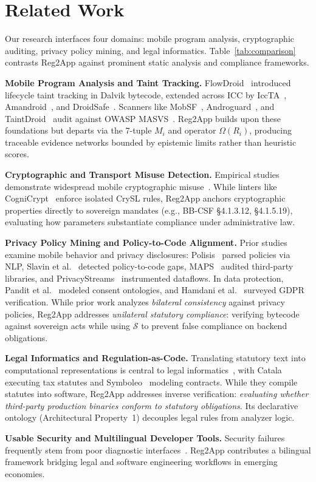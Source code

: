 \section{Related Work}
\label{sec:related}
Our research interfaces four domains: mobile program analysis, cryptographic auditing, privacy policy mining, and legal informatics. Table~\ref{tab:comparison} contrasts Reg2App against prominent static analysis and compliance frameworks.

\noindent\textbf{Mobile Program Analysis and Taint Tracking.} FlowDroid~\cite{flowdroid} introduced lifecycle taint tracking in Dalvik bytecode, extended across ICC by IccTA~\cite{iccta}, Amandroid~\cite{amandroid}, and DroidSafe~\cite{droidsafe}. Scanners like MobSF~\cite{mobsf}, Androguard~\cite{androguard}, and TaintDroid~\cite{chortler} audit against OWASP MASVS~\cite{owasp_masvs}. Reg2App builds upon these foundations but departs via the 7-tuple $M_i$ and operator $\Omega(R_i)$, producing traceable evidence networks bounded by epistemic limits rather than heuristic scores.

\noindent\textbf{Cryptographic and Transport Misuse Detection.} Empirical studies demonstrate widespread mobile cryptographic misuse~\cite{crypto_misuse_ccs, fahl_msc, castle_crypto}. While linters like CogniCrypt~\cite{cognicrypt} enforce isolated CrySL rules, Reg2App anchors cryptographic properties directly to sovereign mandates (e.g., BB-CSF §4.1.3.12, §4.1.5.19), evaluating how parameters substantiate compliance under administrative law.

\noindent\textbf{Privacy Policy Mining and Policy-to-Code Alignment.} Prior studies examine mobile behavior and privacy disclosures: Polisis~\cite{polisis} parsed policies via NLP, Slavin et al.~\cite{slavin_icse} detected policy-to-code gaps, MAPS~\cite{appinspect} audited third-party libraries, and PrivacyStreams~\cite{privacystreams} instrumented dataflows. In data protection, Pandit et al.~\cite{gdpr_ont} modeled consent ontologies, and Hamdani et al.~\cite{hamdani_2023} surveyed GDPR verification. While prior work analyzes \textit{bilateral consistency} against privacy policies, Reg2App addresses \textit{unilateral statutory compliance}: verifying bytecode against sovereign acts while using $\mathcal{S}$ to prevent false compliance on backend obligations.

\noindent\textbf{Legal Informatics and Regulation-as-Code.} Translating statutory text into computational representations is central to legal informatics~\cite{breaux_requirements, legalruleml, gordon_legal_kg, rac_survey}, with Catala~\cite{catala} executing tax statutes and Symboleo~\cite{symboleo} modeling contracts. While they compile statutes into software, Reg2App addresses inverse verification: \textit{evaluating whether third-party production binaries conform to statutory obligations}. Its declarative ontology (Architectural Property~1) decouples legal rules from analyzer logic.

\noindent\textbf{Usable Security and Multilingual Developer Tools.} Security failures frequently stem from poor diagnostic interfaces~\cite{sasse_usable_sec, acar_developers, wash_developers}. Reg2App contributes a bilingual framework bridging legal and software engineering workflows in emerging economies.
